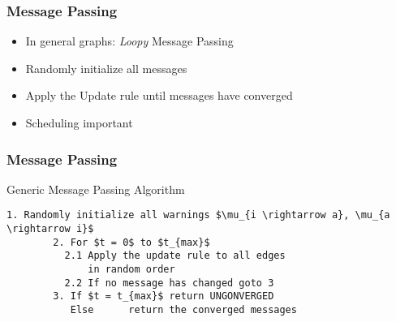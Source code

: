 \begin{frame}
	\frametitle{Message Passing}
	\begin{itemize}
		\item In general graphs: \emph{Loopy} Message Passing
		\item Randomly initialize all messages
		\item Apply the Update rule until messages have converged
		\item Scheduling important
	\end{itemize}

		
\end{frame}




\begin{frame}[containsverbatim]
	\frametitle{Message Passing}
	Generic Message Passing Algorithm
	\begin{lstlisting}[mathescape = true, gobble=15, basicstyle=\ttfamily]
		1. Randomly initialize all warnings $\mu_{i \rightarrow a}, \mu_{a \rightarrow i}$
		2. For $t = 0$ to $t_{max}$
		  2.1 Apply the update rule to all edges
		      in random order
		  2.2 If no message has changed goto 3
		3. If $t = t_{max}$ return UNGONVERGED
		   Else      return the converged messages
	\end{lstlisting}
\end{frame}
